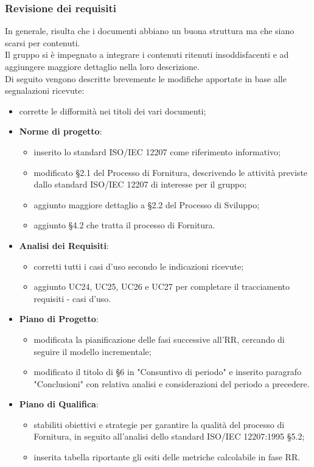 	\subsubsection{Revisione dei requisiti}
		In generale, risulta che i documenti abbiano un buona struttura ma che siano scarsi per contenuti. \\
		Il gruppo si è impegnato a integrare i contenuti ritenuti insoddisfacenti e ad aggiungere maggiore dettaglio nella loro descrizione.\\ 
		 Di seguito vengono descritte brevemente le modifiche apportate in base alle segnalazioni ricevute:
	\begin{itemize}
		\item corrette le difformità nei titoli dei vari documenti;
		\item \textbf{Norme di progetto}: 
			\begin{itemize}	
				\item inserito lo standard ISO/IEC 12207 come riferimento informativo;
				\item modificato §2.1 del Processo di Fornitura, descrivendo le attività previste dallo standard ISO/IEC 12207 di interesse per il gruppo;
				\item aggiunto maggiore dettaglio a §2.2 del Processo di Sviluppo;
				\item aggiunto §4.2 che tratta il processo di Fornitura.
			\end{itemize}
		\item \textbf{Analisi dei Requisiti}: 
			\begin{itemize}
				\item corretti tutti i casi d'uso secondo le indicazioni ricevute;
				\item aggiunto UC24, UC25, UC26 e UC27 per completare il tracciamento requisiti - casi d'uso.
			\end{itemize} 
		\item \textbf{Piano di Progetto}: 
			\begin{itemize}
				\item modificata la pianificazione delle fasi successive all'RR, cercando di seguire il modello incrementale;
				\item modificato il titolo di §6 in "Consuntivo di periodo" e inserito paragrafo "Conclusioni" con relativa analisi e considerazioni del periodo a precedere.
			\end{itemize}
		\item \textbf{Piano di Qualifica}: 
			\begin{itemize}
				\item stabiliti obiettivi e strategie per garantire la qualità del processo di Fornitura, in seguito all'analisi dello standard ISO/IEC 12207:1995 §5.2;
				\item inserita tabella riportante gli esiti delle metriche calcolabile in fase RR.
			\end{itemize}
	\end{itemize}
\newpage
